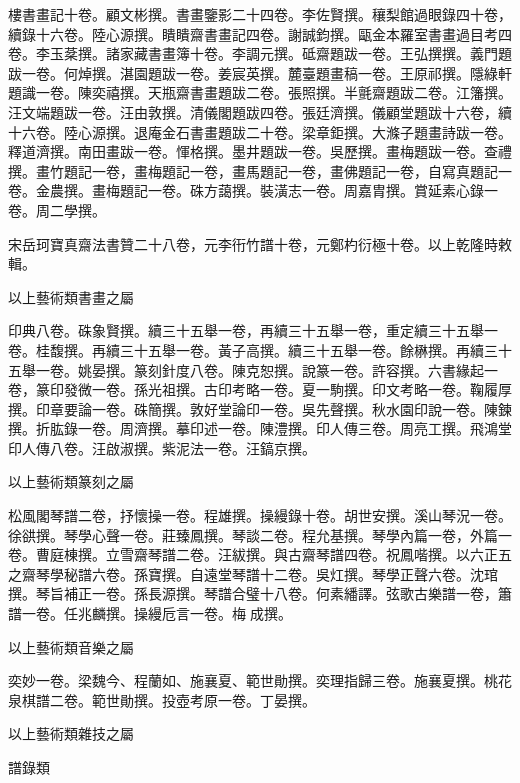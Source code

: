 \begin{pinyinscope}
樓書畫記十卷。顧文彬撰。書畫鑒影二十四卷。李佐賢撰。穰梨館過眼錄四十卷，續錄十六卷。陸心源撰。瞶瞶齋書畫記四卷。謝誠鈞撰。甌金本羅室書畫過目考四卷。李玉棻撰。諸家藏書畫簿十卷。李調元撰。砥齋題跋一卷。王弘撰撰。義門題跋一卷。何焯撰。湛園題跋一卷。姜宸英撰。麓臺題畫稿一卷。王原祁撰。隱綠軒題識一卷。陳奕禧撰。天瓶齋書畫題跋二卷。張照撰。半氈齋題跋二卷。江籓撰。汪文端題跋一卷。汪由敦撰。清儀閣題跋四卷。張廷濟撰。儀顧堂題跋十六卷，續十六卷。陸心源撰。退庵金石書畫題跋二十卷。梁章鉅撰。大滌子題畫詩跋一卷。釋道濟撰。南田畫跋一卷。惲格撰。墨井題跋一卷。吳歷撰。畫梅題跋一卷。查禮撰。畫竹題記一卷，畫梅題記一卷，畫馬題記一卷，畫佛題記一卷，自寫真題記一卷。金農撰。畫梅題記一卷。硃方藹撰。裝潢志一卷。周嘉胄撰。賞延素心錄一卷。周二學撰。

宋岳珂寶真齋法書贊二十八卷，元李衎竹譜十卷，元鄭杓衍極十卷。以上乾隆時敕輯。

以上藝術類書畫之屬

印典八卷。硃象賢撰。續三十五舉一卷，再續三十五舉一卷，重定續三十五舉一卷。桂馥撰。再續三十五舉一卷。黃子高撰。續三十五舉一卷。餘楙撰。再續三十五舉一卷。姚晏撰。篆刻針度八卷。陳克恕撰。說篆一卷。許容撰。六書緣起一卷，篆印發微一卷。孫光祖撰。古印考略一卷。夏一駒撰。印文考略一卷。鞠履厚撰。印章要論一卷。硃簡撰。敦好堂論印一卷。吳先聲撰。秋水園印說一卷。陳鍊撰。折肱錄一卷。周濟撰。摹印述一卷。陳澧撰。印人傳三卷。周亮工撰。飛鴻堂印人傳八卷。汪啟淑撰。紫泥法一卷。汪鎬京撰。

以上藝術類篆刻之屬

松風閣琴譜二卷，抒懷操一卷。程雄撰。操縵錄十卷。胡世安撰。溪山琴況一卷。徐谼撰。琴學心聲一卷。莊臻鳳撰。琴談二卷。程允基撰。琴學內篇一卷，外篇一卷。曹庭棟撰。立雪齋琴譜二卷。汪紱撰。與古齋琴譜四卷。祝鳳喈撰。以六正五之齋琴學秘譜六卷。孫寶撰。自遠堂琴譜十二卷。吳灴撰。琴學正聲六卷。沈琯撰。琴旨補正一卷。孫長源撰。琴譜合璧十八卷。何素繙譯。弦歌古樂譜一卷，簫譜一卷。任兆麟撰。操縵卮言一卷。梅成撰。

以上藝術類音樂之屬

奕妙一卷。梁魏今、程蘭如、施襄夏、範世勛撰。奕理指歸三卷。施襄夏撰。桃花泉棋譜二卷。範世勛撰。投壺考原一卷。丁晏撰。

以上藝術類雜技之屬

譜錄類


\end{pinyinscope}
